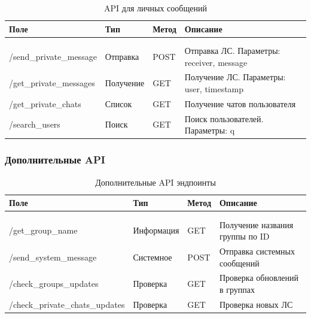\begin{xltabular}{\textwidth}{|l|l|p{1.7cm}|X|}
	\caption{API для личных сообщений}\label{tab:private_api} \\ \hline
	\centrow Поле & \centrow Тип & \centrow Метод & \centrow Описание \\ \hline
	 &  &  &  \\ \hline
	\endfirsthead
	 &  &  &  \\ \hline
	\finishhead
	/send\_private\_message & Отправка & POST & Отправка ЛС. Параметры: receiver, message \\ \hline 
	/get\_private\_messages & Получение & GET & Получение ЛС. Параметры: user, timestamp \\ \hline 
	/get\_private\_chats & Список & GET & Получение чатов пользователя \\ \hline 
	/search\_users & Поиск & GET & Поиск пользователей. Параметры: q \\ \hline 
\end{xltabular}

\subsubsection{Дополнительные API}

\begin{xltabular}{\textwidth}{|l|l|p{1.7cm}|X|}
	\caption{Дополнительные API эндпоинты}\label{tab:additional_api} \\ \hline
	\centrow Поле & \centrow Тип & \centrow Метод & \centrow Описание \\ \hline
	 &  &  &  \\ \hline
	\endfirsthead
	 &  &  &  \\ \hline
	\finishhead
	/get\_group\_name & Информация & GET & Получение названия группы по ID \\ \hline 
	/send\_system\_message & Системное & POST & Отправка системных сообщений \\ \hline 
	/check\_groups\_updates & Проверка & GET & Проверка обновлений в группах \\ \hline 
	/check\_private\_chats\_updates & Проверка & GET & Проверка новых ЛС \\ \hline 
\end{xltabular}

